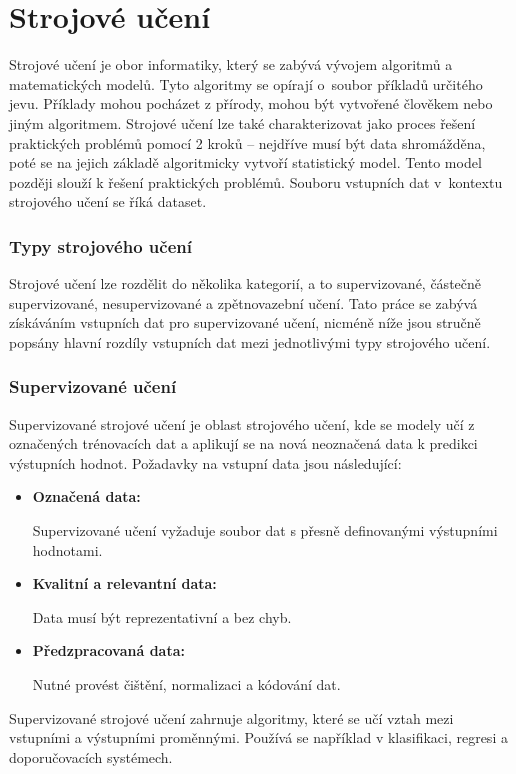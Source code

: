 \section{Strojové učení}
Strojové učení je obor informatiky, který se zabývá vývojem algoritmů a matematických modelů. Tyto algoritmy se opírají o~soubor příkladů určitého jevu. Příklady mohou pocházet z přírody, mohou být vytvořené člověkem nebo jiným algoritmem. Strojové učení lze také charakterizovat jako proces řešení praktických problémů pomocí 2 kroků -- nejdříve musí být data shromážděna, poté se na jejich základě algoritmicky vytvoří statistický model. Tento model později slouží k řešení praktických problémů. Souboru vstupních dat v~kontextu strojového učení se říká dataset. \cite{bishop2006pattern}

\subsubsection{Typy strojového učení}
Strojové učení lze rozdělit do několika kategorií, a to supervizované, částečně supervizované, nesupervizované a zpětnovazební učení. Tato práce se zabývá získáváním vstupních dat pro supervizované učení, nicméně níže jsou stručně popsány hlavní rozdíly vstupních dat mezi jednotlivými typy strojového učení.\cite{burkov2019}

\subsubsection{Supervizované učení}
Supervizované strojové učení je oblast strojového učení, kde se modely učí z označených trénovacích dat a aplikují se na nová neoznačená data k predikci výstupních hodnot. Požadavky na vstupní data jsou následující: 
\begin{itemize}
    \item \textbf{Označená data:}
    
    Supervizované učení vyžaduje soubor dat s přesně definovanými výstupními hodnotami.
    \item \textbf{Kvalitní a relevantní data:} 
    
    Data musí být reprezentativní a bez chyb.
    \item \textbf{Předzpracovaná data:} 
    
    Nutné provést čištění, normalizaci a kódování dat.
\end{itemize}

Supervizované strojové učení zahrnuje algoritmy, které se učí vztah mezi vstupními a výstupními proměnnými. Používá se například v klasifikaci, regresi a doporučovacích systémech. \cite{bishop2006pattern}

